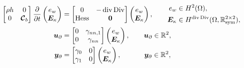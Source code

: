 \begin{subequations}\label{eq:pHlinsys_Kir1}
\begin{align}
\begin{bmatrix}
\rho h & 0 \\
0 & \bm{\mathcal{C}}_b
\end{bmatrix}
\diffp{}{t}
\begin{pmatrix}
e_w \\
\bm{E}_{\kappa} \\
\end{pmatrix} &= 
\begin{bmatrix}
	0  &  - \div\Div \\
	\Hess & \bm{0} \\
	\end{bmatrix}
\begin{pmatrix}
e_w \\
\bm{E}_{\kappa} \\
\end{pmatrix}, \qquad
\begin{aligned}
e_w &\in H^2(\Omega),  \\
\bm{E}_\kappa &\in H^{\div\Div}(\Omega,\mathbb{R}^{2\times 2}_{\text{sym}}), \label{eq:pHdyn_Kir1} \\
\end{aligned} 
 \vspace{3pt}\\
\bm{u}_\partial  &= 
	\begin{bmatrix}
	{0} & \gamma_{nn, 1}\\
	{0} & \gamma_{nn}\\
	\end{bmatrix} \begin{pmatrix}
e_w \\
\bm{E}_{\kappa} \\
\end{pmatrix}, \qquad \bm{u}_\partial \in \mathbb{R}^2, \vspace{3pt}\\
\bm{y}_\partial &= 
	\begin{bmatrix}
	\gamma_{0} & {0} \\
	\gamma_{1} & {0} \\
	\end{bmatrix}
\begin{pmatrix}
e_w \\
\bm{E}_{\kappa} \\
\end{pmatrix}, \qquad\quad\; \bm{y}_\partial \in \mathbb{R}^2,
\end{align}
\end{subequations}
